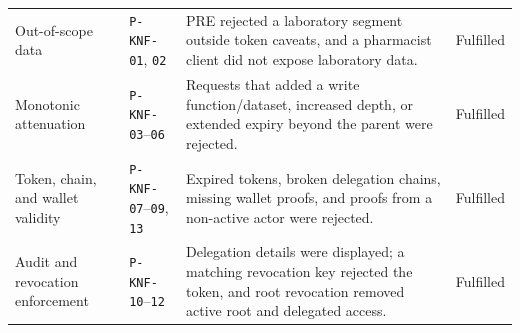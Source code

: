 \documentclass[conference,a4paper,english]{IEEEtran}
\begin{document}
\begin{table}[t]
\begin{tabular}{@{}p{}p{}p{}p{}@{}}
		Out-of-scope data                                                                                                                              &
		\texttt{P-KNF-01}, \texttt{02}                                                                                                                 &
		PRE rejected a laboratory segment outside token caveats, and a pharmacist client did not expose laboratory data.                               &
		Fulfilled                                                                                                                                                                                                                              \\
		Monotonic attenuation                                                                                                                          &
		\texttt{P-KNF-03}--\texttt{06}                                                                                                                 &
		Requests that added a write function/dataset, increased depth, or extended expiry beyond the parent were rejected.                             &
		Fulfilled                                                                                                                                                                                                                              \\
		Token, chain, and wallet validity                                                                                                              &
		\texttt{P-KNF-07}--\texttt{09}, \texttt{13}                                                                                                    &
		Expired tokens, broken delegation chains, missing wallet proofs, and proofs from a non-active actor were rejected.                             &
		Fulfilled                                                                                                                                                                                                                              \\
		Audit and revocation enforcement                                                                                                               &
		\texttt{P-KNF-10}--\texttt{12}                                                                                                                 &
		Delegation details were displayed; a matching revocation key rejected the token, and root revocation removed active root and delegated access. &
		Fulfilled                                                                                                                                                                                                                              \\

\end{tabular}
\end{table}
\end{document}
